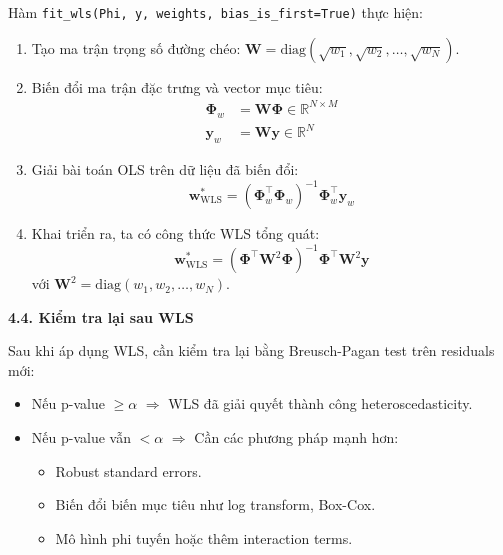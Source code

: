 Hàm \texttt{fit\_wls(Phi, y, weights, bias\_is\_first=True)} thực hiện:
\begin{enumerate}
    \item Tạo ma trận trọng số đường chéo: $\mathbf{W} = \text{diag}(\sqrt{w_1}, \sqrt{w_2}, \ldots, \sqrt{w_N})$.
    
    \item Biến đổi ma trận đặc trưng và vector mục tiêu:
    \begin{align*}
    \mathbf{\Phi}_w &= \mathbf{W} \mathbf{\Phi} \in \mathbb{R}^{N \times M} \\
    \mathbf{y}_w &= \mathbf{W} \mathbf{y} \in \mathbb{R}^{N}
    \end{align*}
    
    \item Giải bài toán OLS trên dữ liệu đã biến đổi:
    \begin{equation}
    \mathbf{w}^*_{\text{WLS}} = (\mathbf{\Phi}_w^{\top} \mathbf{\Phi}_w)^{-1} \mathbf{\Phi}_w^{\top} \mathbf{y}_w
    \end{equation}
    
    \item Khai triển ra, ta có công thức WLS tổng quát:
    \begin{equation}
    \mathbf{w}^*_{\text{WLS}} = (\mathbf{\Phi}^{\top} \mathbf{W}^2 \mathbf{\Phi})^{-1} \mathbf{\Phi}^{\top} \mathbf{W}^2 \mathbf{y}
    \end{equation}
    với $\mathbf{W}^2 = \text{diag}(w_1, w_2, \ldots, w_N)$.
\end{enumerate}

\textbf{4.4. Kiểm tra lại sau WLS}

Sau khi áp dụng WLS, cần kiểm tra lại bằng Breusch-Pagan test trên residuals mới:
\begin{itemize} [labelsep=10pt, leftmargin=2cm]
    \item Nếu p-value $\geq \alpha$ $\Rightarrow$ WLS đã giải quyết thành công heteroscedasticity.
    \item Nếu p-value vẫn $< \alpha$ $\Rightarrow$ Cần các phương pháp mạnh hơn:
    \begin{itemize}
        \item Robust standard errors.
        \item Biến đổi biến mục tiêu như log transform, Box-Cox.
        \item Mô hình phi tuyến hoặc thêm interaction terms.
    \end{itemize}
\end{itemize}

